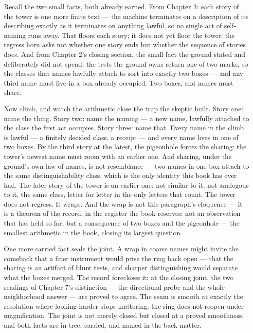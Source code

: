 Recall the two small facts, both already earned. From Chapter 3: each story of the
tower is one more finite text --- the machine terminates on a description of its
describing exactly as it terminates on anything lawful, so no single act of
self-naming runs away. That floors each story; it does not yet floor the tower: the
regress horn asks not whether one story ends but whether the sequence of stories
does. And from Chapter 2's closing section, the small fact the ground stated and
deliberately did not spend: the tests the ground owns return one of two marks, so
the classes that names lawfully attach to sort into exactly two boxes --- and any
third name must live in a box already occupied. Two boxes, and names must share.

Now climb, and watch the arithmetic close the trap the skeptic built. Story one:
name the thing. Story two: name the naming --- a new name, lawfully attached to the
class the first act occupies. Story three: name that. Every name in the climb is
lawful --- a finitely decided class, a receipt --- and every name lives in one of
two boxes. By the third story at the latest, the pigeonhole forces the sharing:
the tower's newest name must room with an earlier one. And sharing, under the
ground's own law of names, is not resemblance --- two names in one box attach to
the same distinguishability class, which is the only identity this book has ever
had. The later story of the tower is an earlier one: not similar to it, not
analogous to it, the same class, letter for letter in the only letters that count.
The tower does not regress. It wraps. And the wrap is not this paragraph's
eloquence --- it is a theorem of the record, in the register the book reserves:
not an observation that has held so far, but a consequence of two boxes and the
pigeonhole --- the smallest arithmetic in the book, closing its largest question.

One more carried fact seals the joint. A wrap in coarse names might invite the
comeback that a finer instrument would prise the ring back open --- that the
sharing is an artifact of blunt tests, and sharper distinguishing would separate
what the boxes merged. The record forecloses it: at the closing joint, the two
readings of Chapter 7's distinction --- the directional probe and the
whole-neighborhood answer --- are proved to agree. The seam is smooth at exactly
the resolution where looking harder stops mattering; the ring does not reopen
under magnification. The joint is not merely closed but closed at a proved
smoothness, and both facts are in-tree, carried, and named in the back matter.

